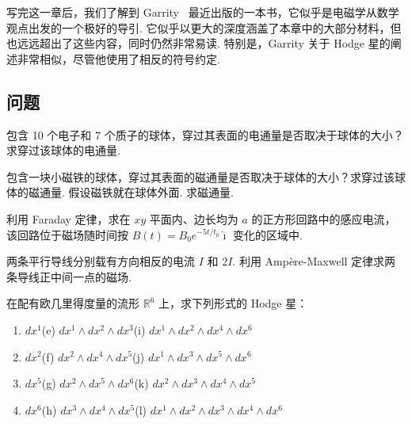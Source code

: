 写完这一章后，我们了解到 Garrity~\cite{ref23} 最近出版的一本书，它似乎是电磁学从数学观点出发的一个极好的导引. 它似乎以更大的深度涵盖了本章中的大部分材料，但也远远超出了这些内容，同时仍然非常易读. 特别是，Garrity 关于 Hodge 星的阐述非常相似，尽管他使用了相反的符号约定.

\subsection{问题}

\begin{question}\label{q:12-12}
包含 10 个电子和 7 个质子的球体，穿过其表面的电通量是否取决于球体的大小？求穿过该球体的电通量.
\end{question}

\begin{question}\label{q:12-13}
包含一块小磁铁的球体，穿过其表面的磁通量是否取决于球体的大小？求穿过该球体的磁通量. 假设磁铁就在球体外面. 求磁通量.
\end{question}

\begin{question}\label{q:12-14}
利用 Faraday 定律，求在 $xy$ 平面内、边长均为 $a$ 的正方形回路中的感应电流，该回路位于磁场随时间按 $B(t)=B_0e^{-5t/t_0}\hat{\imath}$ 变化的区域中.
\end{question}

\begin{question}\label{q:12-15}
两条平行导线分别载有方向相反的电流 $I$ 和 $2I$. 利用 Ampère-Maxwell 定律求两条导线正中间一点的磁场.
\end{question}

\begin{question}\label{q:12-16}
在配有欧几里得度量的流形 $\mathbb{R}^6$ 上，求下列形式的 Hodge 星：
\begin{enumerate}
  \item[(a)] $dx^1$\qquad (e) $dx^1\wedge dx^2\wedge dx^3$\qquad (i) $dx^1\wedge dx^2\wedge dx^4\wedge dx^6$
  \item[(b)] $dx^2$\qquad (f) $dx^2\wedge dx^4\wedge dx^5$\qquad (j) $dx^1\wedge dx^3\wedge dx^5\wedge dx^6$
  \item[(c)] $dx^5$\qquad (g) $dx^2\wedge dx^5\wedge dx^6$\qquad (k) $dx^2\wedge dx^3\wedge dx^4\wedge dx^5$
  \item[(d)] $dx^6$\qquad (h) $dx^3\wedge dx^4\wedge dx^5$\qquad (l) $dx^1\wedge dx^2\wedge dx^3\wedge dx^4\wedge dx^6$
\end{enumerate}
\end{question}

